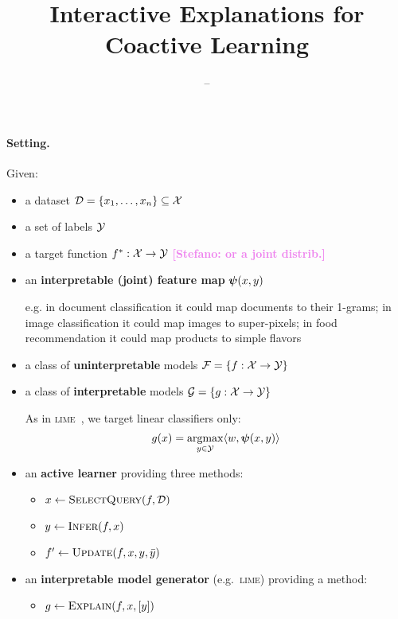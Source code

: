 \documentclass[a4paper,12pt]{article}
\title{Interactive Explanations for Coactive Learning}
\author{--}
\newcommand{\stefano}[1]{{\bf \textcolor{violet}{{[Stefano: #1]}}}}
\newcommand{\lime}{\textsc{lime}}
\begin{document}
\maketitle

\paragraph{Setting.} Given:

\begin{itemize}

    \item a dataset $\mathcal{D} = \{ x_1, \ldots, x_n \} \subseteq \mathcal{X}$

    \item a set of labels $\mathcal{Y}$

    \item a target function $f^* : \mathcal{X} \to \mathcal{Y}$ \stefano{or a joint distrib.}

    \item an \textbf{interpretable (joint) feature map} $\boldsymbol{\psi}(x,y)$

        e.g. in document classification it could map documents to their
        1-grams; in image classification it could map images to
        super-pixels; in food recommendation it could map products to
        simple flavors

    \item a class of \textbf{uninterpretable} models $\mathcal{F} = \{ f : \mathcal{X} \to \mathcal{Y} \}$

    \item a class of \textbf{interpretable} models $\mathcal{G} = \{ g : \mathcal{X} \to \mathcal{Y} \}$

        As in \lime~\cite{ribeiro2016should}, we target linear
        classifiers only:
        $$ g(x) = \operatorname*{argmax}_{y\in\mathcal{Y}} \langle w, \boldsymbol{\psi}(x,y) \rangle $$

    \item an \textbf{active learner} providing three methods:

        \begin{itemize}
            \item $x \gets \textsc{SelectQuery}(f,\mathcal{D})$
            \item $y \gets \textsc{Infer}(f,x)$
            \item $f' \gets \textsc{Update}(f,x,y,\bar{y})$
        \end{itemize}

    \item an \textbf{interpretable model generator} (e.g.~\lime)
        providing a method:

        \begin{itemize}
            \item $g \gets \textsc{Explain}(f,x,[y])$
        \end{itemize}

\end{itemize}
\end{document}
